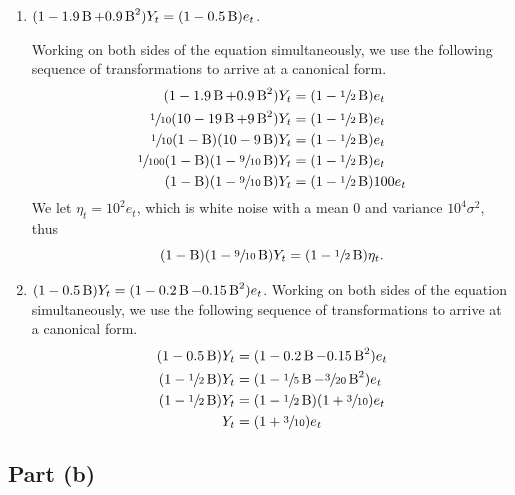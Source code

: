 \documentclass[
]{article}
\begin{document}
\begin{enumerate}
\item [(i)] $(1 - 1.9 \operatorname{B} + 0.9 \operatorname{B}^2) Y_t = (1 - 0.5 \operatorname{B}) e_t$.

Working on both sides of the equation simultaneously, we use the following
sequence of transformations to arrive at a canonical form.
\begin{align*}
  (1 - 1.9 \operatorname{B} + 0.9 \operatorname{B}^2) Y_t &= (1 - \sfrac{1}{2} \operatorname{B}) e_t\\
  \sfrac{1}{10}(10 - 19 \operatorname{B} + 9 \operatorname{B}^2) Y_t &= (1 - \sfrac{1}{2} \operatorname{B}) e_t\\
  \sfrac{1}{10}(1-\operatorname{B})(10-9\operatorname{B}) Y_t  &=  (1 - \sfrac{1}{2} \operatorname{B}) e_t\\
  \sfrac{1}{100}(1-\operatorname{B})(1-\sfrac{9}{10}\operatorname{B}) Y_t  &=  (1 - \sfrac{1}{2} \operatorname{B}) e_t\\
  (1-\operatorname{B})(1-\sfrac{9}{10}\operatorname{B}) Y_t  &=  (1 - \sfrac{1}{2} \operatorname{B}) 100 e_t
\end{align*}
We let $\eta_t = 10^2 e_t$, which is white noise with a mean $0$ and variance
$10^4 \sigma^2$, thus
$$
  (1-\operatorname{B})(1-\sfrac{9}{10}\operatorname{B}) Y_t = (1 - \sfrac{1}{2} \operatorname{B}) \eta_t.
$$

\item [(ii)] $(1 - 0.5 \operatorname{B}) Y_t = (1 - 0.2 \operatorname{B} - 0.15 \operatorname{B}^2) e_t$.
Working on both sides of the equation simultaneously, we use the following
sequence of transformations to arrive at a canonical form.
\begin{align*}
  (1 - 0.5 \operatorname{B}) Y_t          &= (1 - 0.2 \operatorname{B} - 0.15 \operatorname{B}^2) e_t\\
  (1 - \sfrac{1}{2} \operatorname{B}) Y_t &= (1 - \sfrac{1}{5} \operatorname{B} - \sfrac{3}{20} \operatorname{B}^2) e_t\\
  (1 - \sfrac{1}{2} \operatorname{B}) Y_t &= (1 - \sfrac{1}{2}\operatorname{B})(1 + \sfrac{3}{10}) e_t\\
                                Y_t &= (1 + \sfrac{3}{10}) e_t
\end{align*}
\end{enumerate}

\hypertarget{part-b}{%
\subsection{Part (b)}\label{part-b}}
\end{document}
